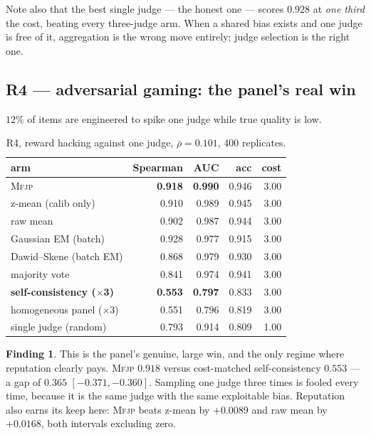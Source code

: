 \documentclass[11pt]{article}
\theoremstyle{definition}
\newtheorem{finding}{Finding}
\newcommand{\rhobar}{\ensuremath{\bar{\rho}}}
\newcommand{\mfjp}{\textsc{Mfjp}}
\begin{document}
Note also that the best single judge --- the honest one --- scores $0.928$ at \emph{one third}
the cost, beating every three-judge arm. When a shared bias exists and one judge is free of
it, aggregation is the wrong move entirely; judge selection is the right one.

\subsection{R4 --- adversarial gaming: the panel's real win}

$12\%$ of items are engineered to spike one judge while true quality is low.

\begin{table}[H]\centering
\begin{tabular}{lrrrr}
\toprule
arm & Spearman & AUC & acc & cost \\
\midrule
\mfjp{}                       & \textbf{0.918} & \textbf{0.990} & 0.946 & 3.00 \\
z-mean (calib only)           & 0.910 & 0.989 & 0.945 & 3.00 \\
raw mean                      & 0.902 & 0.987 & 0.944 & 3.00 \\
Gaussian EM (batch)           & 0.928 & 0.977 & 0.915 & 3.00 \\
Dawid--Skene (batch EM)       & 0.868 & 0.979 & 0.930 & 3.00 \\
majority vote                 & 0.841 & 0.974 & 0.941 & 3.00 \\
\textbf{self-consistency ($\times$3)} & \textbf{0.553} & \textbf{0.797} & 0.833 & 3.00 \\
homogeneous panel ($\times$3) & 0.551 & 0.796 & 0.819 & 3.00 \\
single judge (random)         & 0.793 & 0.914 & 0.809 & 1.00 \\
\bottomrule
\end{tabular}
\caption{R4, reward hacking against one judge, $\rhobar=0.101$, 400 replicates.}
\end{table}

\begin{finding}
This is the panel's genuine, large win, and the only regime where reputation clearly pays.
\mfjp{} $0.918$ versus cost-matched self-consistency $0.553$ --- a gap of $0.365$
$[-0.371,-0.360]$. Sampling one judge three times is fooled every time, because it is the same
judge with the same exploitable bias. Reputation also earns its keep here: \mfjp{} beats
z-mean by $+0.0089$ and raw mean by $+0.0168$, both intervals excluding zero.
\end{finding}
\end{document}
